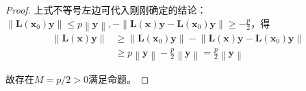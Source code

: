 \documentclass[../main.tex]{subfiles}
\begin{document}
\begin{proof}
    上式不等号左边可代入刚刚确定的结论：$\left\|\mathbf{L}\left(\mathbf{x}_0\right)\mathbf{y}\right\|\leq p\left\|\mathbf{y}\right\|, -\left\|\mathbf{L}\left(\mathbf{x}\right)\mathbf{y}-\mathbf{L}\left(\mathbf{x}_0\right)\mathbf{y}\right\|\geq-\frac{p}{2}$，得
    \begin{align*}
        \left\|\mathbf{L}\left(\mathbf{x}\right)\mathbf{y}\right\| & \geq\left\|\mathbf{L}\left(\mathbf{x}_0\right)\mathbf{y}\right\|-\left\|\mathbf{L}\left(\mathbf{x}\right)\mathbf{y}-\mathbf{L}\left(\mathbf{x}_0\right)\mathbf{y}\right\| \\
                                                                   & \geq p\left\|\mathbf{y}\right\|-\frac{p}{2}\left\|\mathbf{y}\right\|=\frac{p}{2}\left\|\mathbf{y}\right\|
    \end{align*}

    故存在$M=p/2>0$满足命题。
\end{proof}
\end{document}
